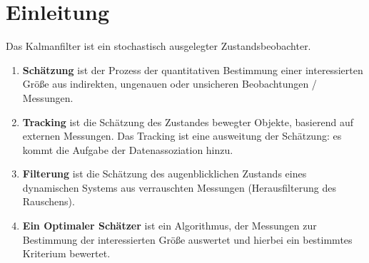 \chapter{Einleitung}
Das Kalmanfilter ist ein stochastisch ausgelegter Zustandsbeobachter.

\begin{enumerate}
    \item \textbf{Schätzung} ist der Prozess der quantitativen Bestimmung einer interessierten Größe aus indirekten,
        ungenauen oder unsicheren Beobachtungen / Messungen.
    \item \textbf{Tracking} ist die Schätzung des Zustandes bewegter Objekte, basierend auf externen Messungen.
        Das Tracking ist eine ausweitung der Schätzung: es kommt die Aufgabe der Datenassoziation hinzu.
    \item \textbf{Filterung} ist die Schätzung des augenblicklichen Zustands eines dynamischen Systems aus
        verrauschten Messungen (Herausfilterung des Rauschens).
    \item \textbf{Ein Optimaler Schätzer} ist ein Algorithmus, der Messungen zur Bestimmung der interessierten Größe
        auswertet und hierbei ein bestimmtes Kriterium bewertet.
\end{enumerate}
